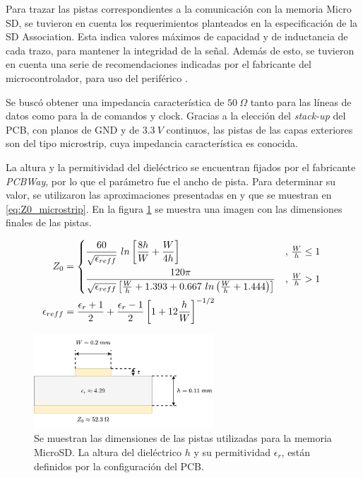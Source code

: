 Para trazar las pistas correspondientes a la comunicación con la memoria Micro SD, se tuvieron en cuenta los requerimientos planteados en la especificación de la SD Association. Esta indica valores máximos de capacidad y de inductancia de cada trazo, para mantener la integridad de la señal. Además de esto, se tuvieron en cuenta una serie de recomendaciones indicadas por el fabricante del microcontrolador, para uso del periférico \cite{AN4661}.


Se buscó obtener una impedancia característica de $50 \ \Omega$ tanto para las líneas de datos como para la de comandos y clock. Gracias a la elección del \textit{stack-up} del PCB, con planos de GND y de $3.3 \ V$ continuos, las pistas de las capas exteriores son del tipo microstrip, cuya impedancia característica es conocida.

La altura y la permitividad del dieléctrico se encuentran fijados por el fabricante \textit{PCBWay}, por lo que el parámetro fue el ancho de pista. Para determinar su valor, se utilizaron las aproximaciones presentadas en \cite[p.~825]{balanis2016antenna} y que se muestran en \eqref{eq:Z0_microstrip}. En la figura \ref{fig:microstrip} se muestra una imagen con las dimensiones finales de las pistas.

\begin{subequations}
    \begin{align}
        Z_0 &= \begin{dcases*}
            \frac{60}{\sqrt{\epsilon_{reff}}} \ ln\left[ \frac{8h}{W} + \frac{W}{4h} \right] & , $\frac{W}{h} \leq 1$\\
            \frac{120 \pi}{\sqrt{\epsilon_{reff}} \left[ \frac{W}{h} + 1.393 + 0.667 \ ln\left(  \frac{W}{h} + 1.444 \right) \right]} & , $\frac{W}{h} > 1$
        \end{dcases*}\\
        \epsilon_{reff} &= \frac{\epsilon_r + 1}{2} + \frac{\epsilon_r - 1}{2} \left[ 1 + 12 \frac{h}{W} \right]^{-1/2}
    \end{align}
    \label{eq:Z0_microstrip}
\end{subequations}


\begin{figure}[htb]
    \centering
    \includegraphics[width=0.6\textwidth]{img/microstrip_2.png}
    \caption{Se muestran las dimensiones de las pistas utilizadas para la memoria MicroSD. La altura del dieléctrico $h$ y su permitividad $\epsilon_r$, están definidos por la configuración del PCB.}
    \label{fig:microstrip}
\end{figure}

